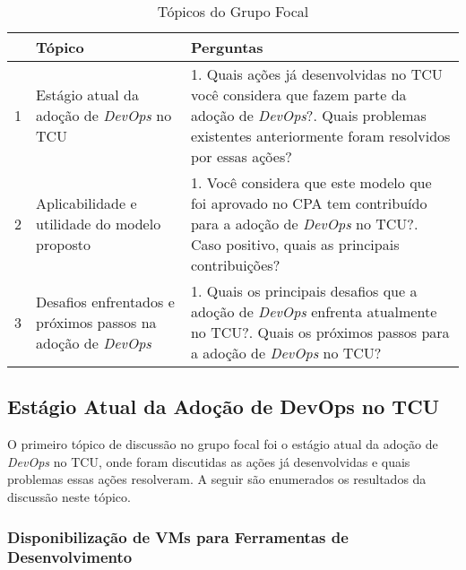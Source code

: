 \begin{table}[hb!]
\centering
\label{tabela_topicos}
\begin{tabular}{|p{0.3cm}|p{6.4cm}|p{7cm}|} \hline
& \textbf{Tópico} & \textbf{Perguntas} \\ \hline

1 & Estágio atual da adoção de {\it DevOps} no \acrshort{TCU} &
1. Quais ações já desenvolvidas no \acrshort{TCU} você considera que fazem parte da adoção de {\it DevOps}?\newline\newline
2. Quais problemas existentes anteriormente foram resolvidos por essas ações? \\ \hline

2 & Aplicabilidade e utilidade do modelo proposto &
1. Você considera que este modelo que foi aprovado no \acrshort{CPA} tem contribuído para a adoção de {\it DevOps} no \acrshort{TCU}?\newline\newline
2. Caso positivo, quais as principais contribuições? \\ \hline

3 & Desafios enfrentados e próximos passos na adoção de {\it DevOps} &
1. Quais os principais desafios que a adoção de {\it DevOps} enfrenta atualmente no \acrshort{TCU}?\newline\newline
2. Quais os próximos passos para a adoção de {\it DevOps} no \acrshort{TCU}?\\ \hline

\end{tabular}
\caption{Tópicos do Grupo Focal}
\end{table}

\subsection{Estágio Atual da Adoção de DevOps no TCU}

O primeiro tópico de discussão no grupo focal foi o estágio atual da adoção de
{\it DevOps} no \acrshort{TCU}, onde foram discutidas as ações já desenvolvidas
e quais problemas essas ações resolveram. A seguir são enumerados os
resultados da discussão neste tópico.

\subsubsection{Disponibilização de \acrshort{VM}s para Ferramentas de Desenvolvimento}

